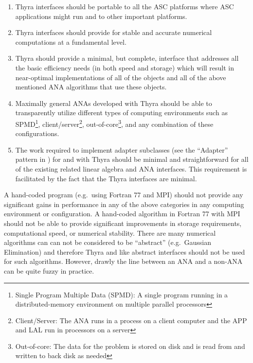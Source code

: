 \documentclass[pdf,ps2pdf,11pt]{SANDreport}
\begin{document}
\begin{enumerate}

{}\item Thyra interfaces should be portable to all the ASC
{}\cite{ref:doe_asci} platforms where ASC applications might run and to other
important platforms.

{}\item Thyra interfaces should provide for stable and accurate numerical
computations at a fundamental level.

{}\item Thyra should provide a minimal, but complete, interface that addresses
all the basic efficiency needs (in both speed and storage) which will result
in near-optimal implementations of all of the objects and all of the above
mentioned ANA algorithms that use these objects.


{}\item Maximally general ANAs developed with Thyra should be able to
transparently utilize different types of computing environments such as
SPMD\footnote{Single Program Multiple Data (SPMD): A single program running in
a distributed-memory environment on multiple parallel processors},
client/server\footnote{Client/Server: The ANA runs in a process on a client
computer and the APP and LAL run in processors on a server},
out-of-core\footnote{Out-of-core: The data for the problem is stored on disk
and is read from and written to back disk as needed}, and any combination of
these configurations.

{}\item The work required to implement adapter subclasses (see the ``Adapter''
pattern in {}\cite{ref:gama_et_al_1995}) for and with Thyra should be minimal
and straightforward for all of the existing related linear algebra and ANA
interfaces.  This requirement is facilitated by the fact that the Thyra
interfaces are minimal.

\end{enumerate}

A hand-coded program (e.g.~using Fortran 77 and MPI) should not provide any
significant gains in performance in any of the above categories in any
computing environment or configuration.  A hand-coded algorithm in Fortran 77
with MPI should not be able to provide significant improvements in storage
requirements, computational speed, or numerical stability.  There are many
numerical algorithms can can not be considered to be ``abstract'' (e.g.\
Gaussian Elimination) and therefore Thyra and like abstract interfaces should
not be used for such algorithms.  However, drawly the line between an ANA and
a non-ANA can be quite fuzzy in practice.
\end{document}
